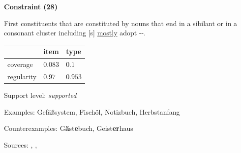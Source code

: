 \vspace{0.4em}

\begin{center}
\textbf{Constraint (28)}
\end{center}

\noindent
First constituents that are constituted by nouns that end in a sibilant or in a consonant cluster including [s] \underline{mostly} adopt \mbox{-{\zeroLinker}-}.
\vspace{0.35em}


\vspace{-0.35em}

\begin{table}[!ht]
\begin{center}

\begin{tabularx}{\columnwidth}{|X|X|X|}
\hline
 & item & type \\
\hline
 coverage & $0.083$ & $0.1$ \\
\hline
 regularity & $0.97$ & $0.953$ \\
\hline
\end{tabularx}
\end{center}
\end{table}

\vspace{-1.35em}

\noindent
Support level: \textit{supported}

\vspace{0.3em}

\noindent
Examples: Gefäß{\zeroLinker}system, Fisch{\zeroLinker}öl, Notiz{\zeroLinker}buch, Herbst{\zeroLinker}anfang

\noindent
Counterexamples: G\textbf{ä}st\textbf{e}buch, Geist\textbf{er}haus

\vspace{0.3em}

\noindent
Sources: \citet[19]{kuerschner_2010}, \citet[89, 109]{ortner_mueller-bollhagen_1991}, \citet[181]{wegener_2005}


